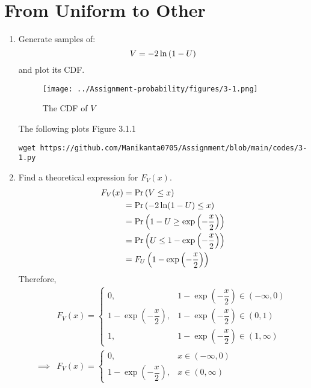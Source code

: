 \documentclass[journal,12pt,twocolumn]{IEEEtran}
\renewcommand\thesection{\arabic{section}}
\begin{document}
\section{From Uniform to Other}
\begin{enumerate}[label=\thesection.\arabic*,ref=\thesection.\theenumi]
    \item
          Generate samples of:
          \begin{equation}
              V = -2\ln\left(1-U\right)
          \end{equation}
          and plot its CDF.
          \\
          \solution
          \begin{figure}[H]
              \centering
              \texttt{[image: ../Assignment-probability/figures/3-1.png]}
              \caption{The CDF of $V$}
              \label{fig:3_cdf}
          \end{figure}
        The following  plots Figure 3.1.1
          \begin{lstlisting}
wget https://github.com/Manikanta0705/Assignment/blob/main/codes/3-1.py
            \end{lstlisting}
    \item Find a theoretical expression for $F_V(x)$.
          \\
          \solution
          \begin{align}
              F_V(x) & = \Pr\left(V \leq x\right)
              \\
                     & = \Pr\left(-2\ln(1-U) \leq x\right)
              \\
                     & = \Pr\left(1-U \geq	\exp{\left(-\dfrac{x}{2}\right)}\right)
              \\
                     & = \Pr\left(U \leq 1 - \exp{\left(-\dfrac{x}{2}\right)}\right)
              \\
                     & = F_U\left(1 - \exp{\left(-\dfrac{x}{2}\right)}\right)
          \end{align}
          Therefore,
          \begin{align}
                       & F_V(x) =
              \begin{cases}
                  0,                                    & 1 - \exp{\left(-\dfrac{x}{2}\right)} \in (-\infty,0)
                  \\
                  1 - \exp{\left(-\dfrac{x}{2}\right)}, & 1 - \exp{\left(-\dfrac{x}{2}\right)} \in (0,1)
                  \\
                  1,                                    & 1 - \exp{\left(-\dfrac{x}{2}\right)} \in (1, \infty)
              \end{cases}
              \\
              \implies & F_V(x) =
              \begin{cases}
                  0,                                    & x \in (-\infty,0)
                  \\
                  1 - \exp{\left(-\dfrac{x}{2}\right)}, & x \in (0,\infty)
              \end{cases}
          \end{align}
\end{enumerate}
\end{document}
